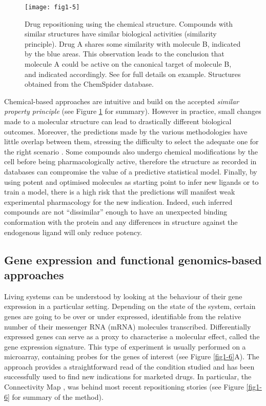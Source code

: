 \begin{figure}[ht]
    \centering
    \texttt{[image: fig1-5]}
    \caption{Drug repositioning using the chemical structure. Compounds with similar structures have similar biological activities (similarity principle). Drug A shares some similarity with molecule B, indicated by the blue areas. This observation leads to the conclusion that molecule A could be active on the canonical target of molecule B, and indicated accordingly. See \cite{keiser2009predicting} for full details on example. Structures obtained from the ChemSpider database.}
    \label{fig1-5}
\end{figure}

Chemical-based approaches are intuitive and build on the accepted \emph{similar property principle} (see Figure \ref{fig1-5} for summary). However in practice, small changes made to a molecular structure can lead to drastically different biological outcomes. Moreover, the predictions made by the various methodologies have little overlap between them, stressing the difficulty to select the adequate one for the right scenario \citep{eckert2007molecular}. Some compounds also undergo chemical modifications by the cell before being pharmacologically active, therefore the structure as recorded in databases can compromise the value of a predictive statistical model. Finally, by using potent and optimised molecules as starting point to infer new ligands or to train a model, there is a high risk that the predictions will manifest weak experimental pharmacology for the new indication. Indeed, such inferred compounds are not ``dissimilar'' enough to have an unexpected binding conformation with the protein and any differences in structure against the endogenous ligand will only reduce potency.

\subsection{Gene expression and functional genomics-based approaches}
\label{expression}

Living systems can be understood by looking at the behaviour of their gene expression in a particular setting. Depending on the state of the system, certain genes are going to be over or under expressed, identifiable from the relative number of their messenger RNA (mRNA) molecules transcribed. Differentially expressed genes can serve as a proxy to characterise a molecular effect, called the gene expression signature. This type of experiment is usually performed on a microarray, containing probes for the genes of interest (see Figure \ref{fig1-6}A). The approach provides a straightforward read of the condition studied and has been successfully used to find new indications for marketed drugs. In particular, the Connectivity Map \citep{lamb2006connectivity}, was behind most recent repositioning stories (see Figure \ref{fig1-6} for summary of the method).

